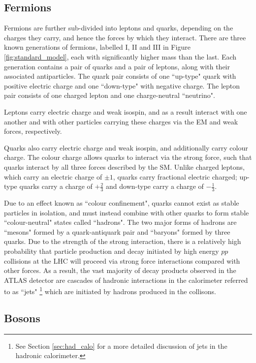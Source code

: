 \subsection{Fermions}

Fermions are further sub-divided into leptons and quarks, depending on the charges they carry, and hence the forces by which they interact. There are three known generations of fermions, labelled I, II and III in Figure \ref{fig:standard_model}, each with significantly higher mass than the last. Each generation contains a pair of quarks and a pair of leptons, along with their associated antiparticles. The quark pair consists of one ``up-type" quark with positive electric charge and one ``down-type" with negative charge. The lepton pair consists of one charged lepton and one charge-neutral ``neutrino". 

Leptons carry electric charge and weak isospin, and as a result interact with one another and with other particles carrying these charges via the EM and weak forces, respectively.  

Quarks also carry electric charge and weak isospin, and additionally carry colour charge. The colour charge allows quarks to interact via the strong force, such that quarks interact by all three forces described by the SM. Unlike charged leptons, which carry an electric charge of \(\pm1\), quarks carry fractional electric charged; up-type quarks carry a charge of \(+\frac{2}{3}\) and down-type carry a charge of \(-\frac{1}{3}\).

Due to an effect known as ``colour confinement", quarks cannot exist as stable particles in isolation, and must instead combine with other quarks to form stable ``colour-neutral" states called ``hadrons". The two major forms of hadrons are ``mesons" formed by a quark-antiquark pair and ``baryons" formed by three quarks. Due to the strength of the strong interaction, there is a relatively high probability that particle production and decay initiated by high energy $pp$ collisions at the LHC will proceed via strong force interactions compared with other forces. As a result, the vast majority of decay products observed in the ATLAS detector are cascades of hadronic interactions in the calorimeter referred to as ``jets" \footnote{See Section \ref{sec:had_calo} for a more detailed discussion of jets in the hadronic calorimeter.} which are initiated by hadrons produced in the collisons.

\subsection{Bosons}

